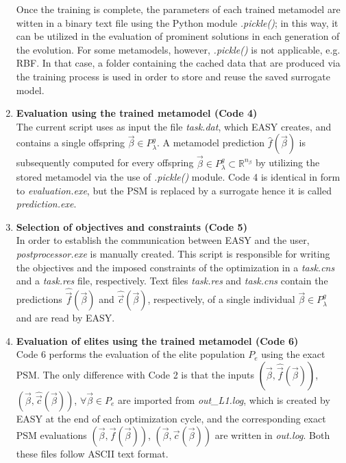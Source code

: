 \begin{enumerate}
Once the training is complete, the parameters of each trained 
metamodel are witten in a binary text file using the Python 
module \textit{.pickle()}; in this way, it can be utilized in 
the evaluation of prominent solutions in each generation of the 
evolution. For some metamodels, however, \textit{.pickle()} is not 
applicable, e.g. RBF. In that case, a folder containing the cached 
data that are produced via the training process is used in order 
to store and reuse the saved surrogate model. 

\item \textbf{Evaluation using the trained metamodel 
(Code 4)} \\ 
The current script uses as input the file \textit{task.dat}, which 
EASY creates, and contains a single offspring $\vec{β} \! \in \! 
P_{λ}^g$. A metamodel prediction $\hat{f}(\vec{β})$ is 
subsequently computed for every offspring $\vec{β} \in P_{λ}^g 
\subset \mathbb{R}^{n_{β}}$ by utilizing the stored 
metamodel via the use of \textit{.pickle()} module. Code 4 is 
identical in form to \textit{evaluation.exe}, but the PSM is 
replaced by a surrogate hence it is called 
\textit{prediction.exe}. 

\item \textbf{Selection of objectives and constraints 
(Code 5)} \\
In order to establish the communication between EASY and 
the user, \textit{postprocessor.exe} is manually created. 
This script is responsible for writing the objectives and the 
imposed constraints of the optimization in a \textit{task.cns} 
and a \textit{task.res} file, respectively. Text files 
\textit{task.res} and \textit{task.cns} contain the predictions 
$\hat{\vec{f}}(\vec{β})$ and $\hat{\vec{c}}(\vec{β})$, 
respectively,  of a single individual $\vec{β} \!\in \!P_{λ}^{g}$ 
and are read by EASY.  
 
\item \textbf{Evaluation of elites using the trained 
metamodel (Code 6)} \\
Code 6 performs the evaluation of the elite population 
$P_{e}$ using the exact PSM. The only difference with Code 2 is 
that the inputs $(\vec{β},\hat{\vec{f}}(\vec{β}))$, $(\vec{β},
\hat{\vec{c}}(\vec{β}))$, $\forall \vec{β} \in P_{e}$ are 
imported from \textit{out\_L1.log}, which is created by EASY at 
the end of each optimization cycle, and the corresponding exact 
PSM evaluations $(\vec{β},\vec{f}(\vec{β}))$, $(\vec{β},\vec{c}
(\vec{β}))$ are written in \textit{out.log}. Both these files 
follow ASCII text format.

\end{enumerate}
\newpage
